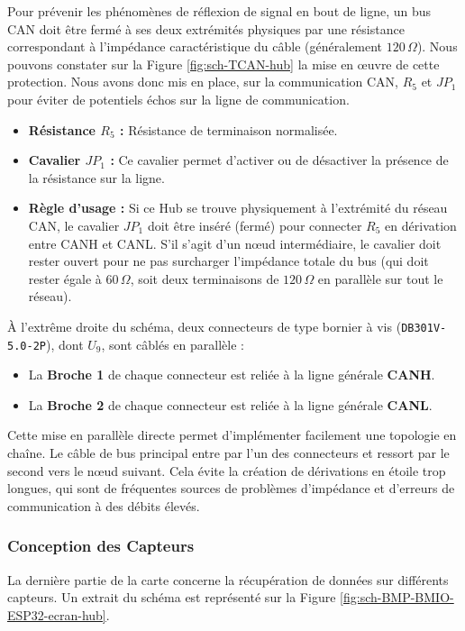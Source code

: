 Pour prévenir les phénomènes de réflexion de signal en bout de ligne, 
un bus CAN doit être fermé à ses deux extrémités physiques par une résistance
correspondant à l'impédance caractéristique du câble (généralement $120\,\Omega$).
Nous pouvons constater sur la Figure \ref{fig:sch-TCAN-hub} la mise en œuvre de cette protection.
Nous avons donc mis en place, sur la communication CAN, $R_5$ et $JP_1$ pour éviter de potentiels échos sur la ligne de communication.

\begin{itemize}
    \item \textbf{Résistance $R_5$ :} Résistance de terminaison normalisée.
    \item \textbf{Cavalier $JP_1$ :} Ce cavalier permet d'activer ou de désactiver la présence de la résistance sur la ligne.
    \item \textbf{Règle d'usage :} Si ce Hub se trouve physiquement à l'extrémité du réseau CAN, le cavalier $JP_1$ doit être inséré (fermé) pour connecter $R_5$ en dérivation entre CANH et CANL. S'il s'agit d'un nœud intermédiaire, le cavalier doit rester ouvert pour ne pas surcharger l'impédance totale du bus (qui doit rester égale à $60\,\Omega$, soit deux terminaisons de $120\,\Omega$ en parallèle sur tout le réseau).
\end{itemize}

À l'extrême droite du schéma, deux connecteurs de type bornier à vis (\texttt{DB301V-5.0-2P}), dont $U_9$, sont câblés en parallèle :
\begin{itemize}
    \item La \textbf{Broche 1} de chaque connecteur est reliée à la ligne générale \textbf{CANH}.
    \item La \textbf{Broche 2} de chaque connecteur est reliée à la ligne générale \textbf{CANL}.
\end{itemize}
Cette mise en parallèle directe permet d'implémenter facilement une topologie en chaîne. Le câble de bus principal entre par l'un des connecteurs et ressort par le second vers le nœud suivant. Cela évite la création de dérivations en étoile trop longues, qui sont de fréquentes sources de problèmes d'impédance et d'erreurs de communication à des débits élevés.

\subsubsection{Conception des Capteurs}

La dernière partie de la carte concerne la récupération de données sur différents capteurs.
Un extrait du schéma est représenté sur la Figure \ref{fig:sch-BMP-BMIO-ESP32-ecran-hub}.

